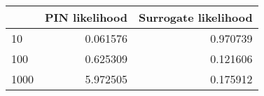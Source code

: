 \begin{tabular}{lrr}
\toprule
{} &  PIN likelihood &  Surrogate likelihood \\
\midrule
10   &        0.061576 &              0.970739 \\
100  &        0.625309 &              0.121606 \\
1000 &        5.972505 &              0.175912 \\
\bottomrule
\end{tabular}
